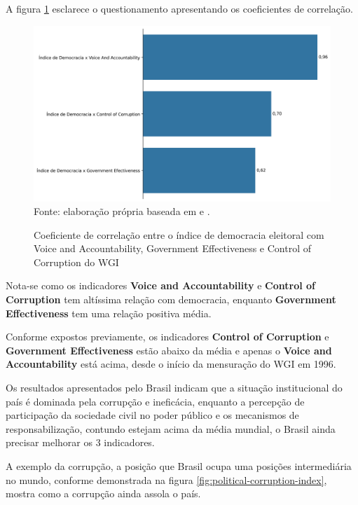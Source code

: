 A figura \ref{fig:correlacao_indicedemocracia_wgi_ge_cc_va} esclarece o questionamento apresentando os coeficientes de correlação.

\begin{figure}[H]
	\centering
	\caption{Coeficiente de correlação entre o índice de democracia eleitoral com Voice and Accountability, Government Effectiveness e Control of Corruption do WGI}
	\includegraphics[width=1\linewidth]{figuras/correlacao_indicedemocracia_wgi_ge_cc_va}
	\label{fig:correlacao_indicedemocracia_wgi_ge_cc_va}
	\footnotesize{Fonte: elaboração própria baseada em \cite{wgi_dados} e \cite{electoral-democracy-index}.}
\end{figure} 

Nota-se como os indicadores \textbf{Voice and Accountability} e \textbf{Control of Corruption} tem altíssima relação com democracia, enquanto \textbf{Government Effectiveness} tem uma relação positiva média.

Conforme expostos previamente, os indicadores \textbf{Control of Corruption} e \textbf{Government Effectiveness} estão abaixo da média e apenas o \textbf{Voice and Accountability} está acima, desde o início da mensuração do WGI em 1996.

Os resultados apresentados pelo Brasil indicam que a situação institucional do país é dominada pela corrupção e ineficácia, enquanto a percepção de participação da sociedade civil no poder público e os mecanismos de responsabilização, contundo estejam acima da média mundial, o Brasil ainda precisar melhorar os 3 indicadores. 

A exemplo da corrupção, a posição que Brasil ocupa uma posições intermediária no mundo, conforme demonstrada na figura \ref{fig:political-corruption-index}, mostra como a corrupção ainda assola o país.

